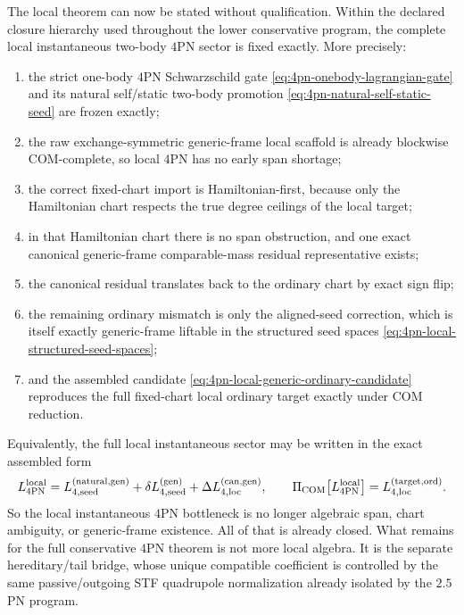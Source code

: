 \documentclass[11pt]{article}
\begin{document}
The local theorem can now be stated without qualification.  Within the declared
closure hierarchy used throughout the lower conservative program, the complete
local instantaneous two-body $4$PN sector is fixed exactly.  More precisely:
\begin{enumerate}
  \item the strict one-body $4$PN Schwarzschild gate
  \eqref{eq:4pn-onebody-lagrangian-gate} and its natural self/static two-body
  promotion \eqref{eq:4pn-natural-self-static-seed} are frozen exactly;
  \item the raw exchange-symmetric generic-frame local scaffold is already
  blockwise COM-complete, so local $4$PN has no early span shortage;
  \item the correct fixed-chart import is Hamiltonian-first, because only the
  Hamiltonian chart respects the true degree ceilings of the local target;
  \item in that Hamiltonian chart there is no span obstruction, and one exact
  canonical generic-frame comparable-mass residual representative exists;
  \item the canonical residual translates back to the ordinary chart by exact
  sign flip;
  \item the remaining ordinary mismatch is only the aligned-seed correction,
  which is itself exactly generic-frame liftable in the structured seed spaces
  \eqref{eq:4pn-local-structured-seed-spaces};
  \item and the assembled candidate
  \eqref{eq:4pn-local-generic-ordinary-candidate} reproduces the full fixed-chart
  local ordinary target exactly under COM reduction.
\end{enumerate}
Equivalently, the full local instantaneous sector may be written in the exact
assembled form
\begin{equation}
L_{4\mathrm{PN}}^{\mathrm{local}}
=
L_{4,\mathrm{seed}}^{(\mathrm{natural,gen})}
+
\delta L_{4,\mathrm{seed}}^{(\mathrm{gen})}
+
\Delta L_{4,\mathrm{loc}}^{(\mathrm{can,gen})},
\qquad
\Pi_{\rm COM}\!\left[L_{4\mathrm{PN}}^{\mathrm{local}}\right]
=
L_{4,\mathrm{loc}}^{(\mathrm{target,ord})}.
\label{eq:4pn-local-final-theorem}
\end{equation}
So the local instantaneous $4$PN bottleneck is no longer algebraic span, chart
ambiguity, or generic-frame existence.  All of that is already closed.  What
remains for the full conservative $4$PN theorem is not more local algebra.  It
is the separate hereditary/tail bridge, whose unique compatible coefficient is
controlled by the same passive/outgoing STF quadrupole normalization already
isolated by the $2.5$PN program.
\end{document}

